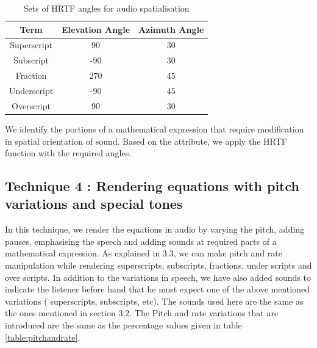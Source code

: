 \documentclass{article}
\begin{document}
\begin{table}[h]
\caption{Sets of HRTF angles for audio spatialisation}

\vspace{8pt} %

\centering
\begin{tabular}{| c | c | c |}
\hline%
Term & Elevation Angle & Azimuth Angle \\[0.5ex]
\hline
Superscript & 90 & 30  \\
Subscript & -90 & 30  \\
Fraction & 270 & 45  \\
Underscript & -90 & 45  \\
Overscript & 90 & 30\\ %
\hline


\end{tabular}
\label{table:hrtf}
\end{table}


We identify the portions of a mathematical expression that require modification in spatial orientation of sound. Based on the attribute, we apply the HRTF function with the required angles.


\subsection{Technique 4 : Rendering equations with pitch variations and special tones}
\label{ssec:t5}


In this technique, we render the equations in audio by varying the pitch, adding pauses, emphasising the speech and adding sounds at required parts of a mathematical expression. As explained in 3.3, we can make pitch and rate manipulation while rendering superscripts, subscripts, fractions, under scripts and over scripts. In addition to the variations in speech, we have also added sounds to indicate the listener before hand that he must expect one of the above mentioned variations ( superscripts, subscripts, etc). The sounds used here are the same as the ones mentioned in section 3.2.
The Pitch and rate variations that are introduced are the same as the percentage values given in table \ref{table:pitchandrate}.
\end{document}
